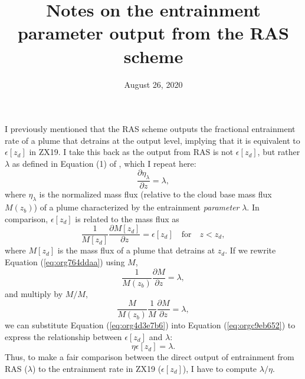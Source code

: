 \documentclass[11pt]{article}
\date{August 26, 2020}
\title{Notes on the entrainment parameter output from the RAS scheme}
\begin{document}
\maketitle
I previously mentioned that the RAS scheme outputs the fractional entrainment rate of a plume that detrains at the output level, implying that it is equivalent to \(\epsilon[z_d]\) in ZX19. I take this back as the output from RAS is not \(\epsilon[z_d]\), but rather \(\lambda\) as defined in Equation (1) of \cite{moorthi1992}, which I repeat here:
\begin{equation}
\label{eq:org764ddaa}
\frac{\partial \eta_{\lambda}}{\partial z} = \lambda,
\end{equation}
where \(\eta_\lambda\) is the normalized mass flux (relative to the cloud base mass flux \(M(z_b)\)) of a plume characterized by the entrainment \emph{parameter} \(\lambda\). In comparison, \(\epsilon[z_d]\) is related to the mass flux as
\begin{equation}
\label{eq:org4d3e7b6}
\frac{1}{M[z_d]}\frac{\partial M[z_d]}{\partial z} = \epsilon[z_d] \quad \mathrm{for} \quad z<z_d,
\end{equation}
where \(M[z_d]\) is the mass flux of a plume that detrains at \(z_d\). If we rewrite Equation (\ref{eq:org764ddaa}) using \(M\),
\begin{equation}
\label{eq:org0e319f7}
\frac{1}{M(z_b)}\frac{\partial M}{\partial z} = \lambda,
\end{equation}
and multiply by \(M/M\),
\begin{equation}
\label{eq:orgc9eb652}
\frac{M}{M(z_b)}\frac{1}{M}\frac{\partial M}{\partial z} = \lambda,
\end{equation}
we can substitute Equation (\ref{eq:org4d3e7b6}) into Equation (\ref{eq:orgc9eb652}) to express the relationship between \(\epsilon[z_d]\) and \(\lambda\):
\begin{equation}
\eta\epsilon[z_d] = \lambda.
\end{equation}
Thus, to make a fair comparison between the direct output of entrainment from RAS (\(\lambda\)) to the entrainment rate in ZX19 (\(\epsilon[z_d]\)), I have to compute \(\lambda/\eta\).



\end{document}
